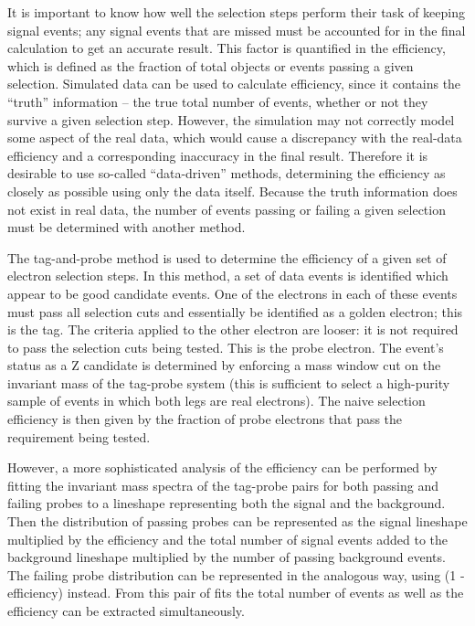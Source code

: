 It is important to know how well the selection steps perform their task of 
keeping signal events;  
any signal events that are 
missed %
must be accounted for in the final 
calculation to get an accurate result.  
This factor is quantified in the efficiency, which is defined as 
the fraction of total objects or events passing a given selection. %
Simulated data can be used to calculate efficiency, 
since it contains the ``truth'' information -- 
the true total number of events, 
whether or not they survive a given selection step.
However, the simulation may not correctly model some 
aspect of the real data, which would cause a discrepancy 
with the real-data efficiency 
and a corresponding inaccuracy in the final result.  
Therefore it is desirable to use so-called ``data-driven'' 
methods, %
determining the efficiency as closely as possible 
using only the data itself.  
Because the truth information does not exist in real data, 
the number of events passing or failing a given selection 
must be determined with another method.  

The tag-and-probe method is used to determine the efficiency of a given set of electron selection steps.  
In this method, a set of data events is identified which appear to be good 
\Zee
candidate events.  
One of the electrons in each of these events must pass 
all selection cuts and essentially be identified as a golden electron; 
this is the tag.  
The criteria applied to the other electron are looser: 
it is not required to pass the selection cuts being tested.  
This is the probe electron.  
The event's status as a Z candidate is determined by enforcing 
a mass window cut on the invariant mass of the tag-probe system 
(this is sufficient %
to select a high-purity sample of 
events in which both legs are real electrons).
The naive selection efficiency is then given by the fraction 
of probe electrons that pass the requirement being tested.  

However, a more sophisticated analysis of the efficiency can 
be performed by fitting the invariant mass spectra of the
tag-probe pairs for both passing and failing probes to a 
lineshape representing both the signal and the background.  
Then the distribution of passing probes can be represented as 
the signal lineshape multiplied by the efficiency and the
total number of signal events added to the background lineshape 
multiplied by the number of passing background events.  
The failing probe distribution can be represented in the 
analogous way, using (1 - efficiency) instead.  
From this pair of fits the total number of events as well as 
the efficiency can be extracted simultaneously.  


